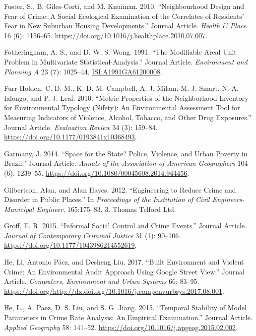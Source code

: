 \documentclass[smallextended]{svjour3}       %
\begin{document}
\leavevmode\hypertarget{ref-Foster2010neighbourhood}{}%
Foster, S., B. Giles-Corti, and M. Knuiman. 2010. ``Neighbourhood Design
and Fear of Crime: A Social-Ecological Examination of the Correlates of
Residents' Fear in New Suburban Housing Developments.'' Journal Article.
\emph{Health \& Place} 16 (6): 1156--65.
\url{https://doi.org/10.1016/j.healthplace.2010.07.007}.

\leavevmode\hypertarget{ref-Fotheringham1991modifiable}{}%
Fotheringham, A. S., and D. W. S. Wong. 1991. ``The Modifiable Areal
Unit Problem in Multivariate Statistical-Analysis.'' Journal Article.
\emph{Environment and Planning A} 23 (7): 1025--44.
\url{ISI:A1991GA61200008}.

\leavevmode\hypertarget{ref-Furr2010metric}{}%
Furr-Holden, C. D. M., K. D. M. Campbell, A. J. Milam, M. J. Smart, N.
A. Ialongo, and P. J. Leaf. 2010. ``Metric Properties of the
Neighborhood Inventory for Environmental Typology (Nifety): An
Environmental Assessment Tool for Measuring Indicators of Violence,
Alcohol, Tobacco, and Other Drug Exposures.'' Journal Article.
\emph{Evaluation Review} 34 (3): 159--84.
\url{https://doi.org/10.1177/0193841x10368493}.

\leavevmode\hypertarget{ref-Garmany2014space}{}%
Garmany, J. 2014. ``Space for the State? Police, Violence, and Urban
Poverty in Brazil.'' Journal Article. \emph{Annals of the Association of
American Geographers} 104 (6): 1239--55.
\url{https://doi.org/10.1080/00045608.2014.944456}.

\leavevmode\hypertarget{ref-Gilbertson2012engineering}{}%
Gilbertson, Alan, and Alan Hayes. 2012. ``Engineering to Reduce Crime
and Disorder in Public Places.'' In \emph{Proceedings of the Institution
of Civil Engineers-Municipal Engineer}, 165:175--83. 3. Thomas Telford
Ltd.

\leavevmode\hypertarget{ref-Groff2015informal}{}%
Groff, E. R. 2015. ``Informal Social Control and Crime Events.'' Journal
Article. \emph{Journal of Contemporary Criminal Justice} 31 (1):
90--106. \url{https://doi.org/10.1177/1043986214552619}.

\leavevmode\hypertarget{ref-He2017built}{}%
He, Li, Antonio Páez, and Desheng Liu. 2017. ``Built Environment and
Violent Crime: An Environmental Audit Approach Using Google Street
View.'' Journal Article. \emph{Computers, Environment and Urban Systems}
66: 83--95.
\url{https://doi.org/http://dx.doi.org/10.1016/j.compenvurbsys.2017.08.001}.

\leavevmode\hypertarget{ref-He2015temporal}{}%
He, L., A. Paez, D. S. Liu, and S. G. Jiang. 2015. ``Temporal Stability
of Model Parameters in Crime Rate Analysis: An Empirical Examination.''
Journal Article. \emph{Applied Geography} 58: 141--52.
\url{https://doi.org/10.1016/j.apgeog.2015.02.002}.
\end{document}
